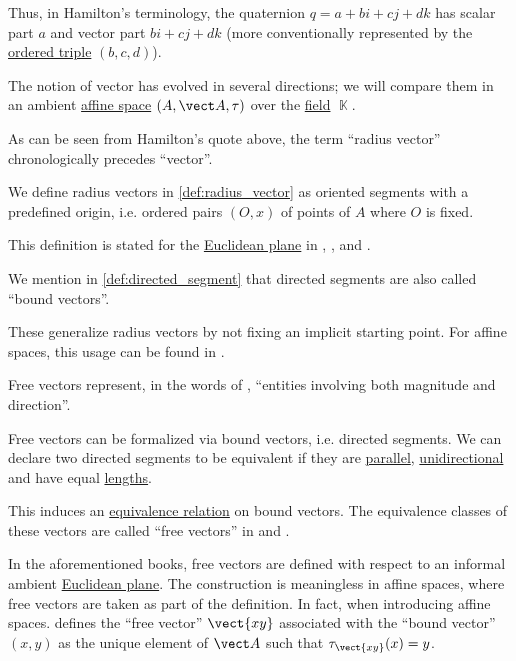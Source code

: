 \begin{remark}
  Thus, in Hamilton's terminology, the quaternion \( q = a + bi + cj + dk \) has scalar part \( a \) and vector part \( bi + cj + dk \) (more conventionally represented by the \hyperref[def:ordered_tuple]{ordered triple} \( (b, c, d) \)).

  The notion of vector has evolved in several directions; we will compare them in an ambient \hyperref[def:affine_space]{affine space} \( (A, \vect A, \tau) \) over the \hyperref[def:field]{field} \( \BbbK \).
  \begin{thmenum}
     As can be seen from Hamilton's quote above, the term \enquote{radius vector} chronologically precedes \enquote{vector}.

    We define radius vectors in \cref{def:radius_vector} as oriented segments with a predefined origin, i.e. ordered pairs \( (O, x) \) of points of \( A \) where \( O \) is fixed.

    This definition is stated for the \hyperref[def:euclidean_plane]{Euclidean plane} in
    \cite[221]{Hadamard2008LessonsInGeometryVol1},
    \cite[86]{Тыртышников2007ЛинейнаяАлгебра},
    \cite[124]{Узков1951ВекторныеПространства} and
    \cite[69]{Станилов1974АналитичнаГеометрия}.

     We mention in \cref{def:directed_segment} that directed segments are also called \enquote{bound vectors}.

    These generalize radius vectors by not fixing an implicit starting point. For affine spaces, this usage can be found in \cite[\S 2.1.13]{Berger1987GeometryI}.

     Free vectors represent, in the words of \textcite[1]{FriedbergInselSpence2018LinearAlgebra}, \enquote{entities involving both magnitude and direction}.

    Free vectors can be formalized via bound vectors, i.e. directed segments. We can declare two directed segments to be equivalent if they are \hyperref[def:affine_parallelism]{parallel}, \hyperref[def:geometric_ray/unidirectional]{unidirectional} and have equal \hyperref[def:line_segment_length]{lengths}.

    This induces an \hyperref[def:equivalence_relation]{equivalence relation} on bound vectors. The equivalence classes of these vectors are called \enquote{free vectors} in \cite[87]{Тыртышников2007ЛинейнаяАлгебра} and \cite[13]{Станилов1974АналитичнаГеометрия}.

    In the aforementioned books, free vectors are defined with respect to an informal ambient \hyperref[def:euclidean_plane]{Euclidean plane}. The construction is meaningless in affine spaces, where free vectors are taken as part of the definition. In fact, when introducing affine spaces. \textcite[\S 2.1.3]{Berger1987GeometryI} defines the \enquote{free vector} \( \vect{xy} \) associated with the \enquote{bound vector} \( (x, y) \) as the unique element of \( \vect A \) such that \( \tau_{\vect{xy}}(x) = y \).


\end{thmenum}
\end{remark}
